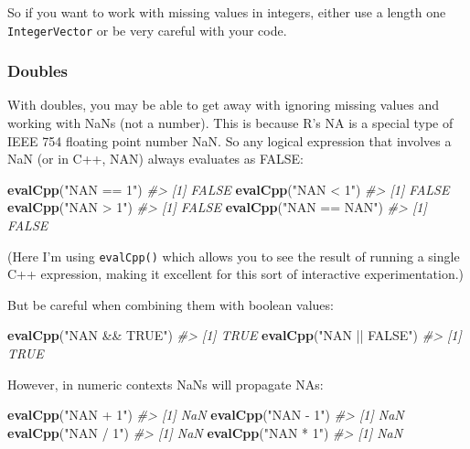 \documentclass[]{book}
\newenvironment{Shaded}{\begin{snugshade}}{\end{snugshade}}
\newcommand{\CommentTok}[1]{\textcolor[rgb]{0.37,0.37,0.37}{\textit{#1}}}
\newcommand{\KeywordTok}[1]{\textcolor[rgb]{0.27,0.27,0.27}{\textbf{#1}}}
\newcommand{\NormalTok}[1]{#1}
\newcommand{\StringTok}[1]{\textcolor[rgb]{0.5,0.5,0.5}{#1}}
\begin{document}
So if you want to work with missing values in integers, either use a length one \texttt{IntegerVector} or be very careful with your code.

\hypertarget{doubles}{%
\subsubsection{Doubles}\label{doubles}}

With doubles, you may be able to get away with ignoring missing values and working with NaNs (not a number). This is because R's NA is a special type of IEEE 754 floating point number NaN. So any logical expression that involves a NaN (or in C++, NAN) always evaluates as FALSE:

\begin{Shaded}
\begin{Highlighting}[]
\KeywordTok{evalCpp}\NormalTok{(}\StringTok{"NAN == 1"}\NormalTok{)}
\CommentTok{#> [1] FALSE}
\KeywordTok{evalCpp}\NormalTok{(}\StringTok{"NAN < 1"}\NormalTok{)}
\CommentTok{#> [1] FALSE}
\KeywordTok{evalCpp}\NormalTok{(}\StringTok{"NAN > 1"}\NormalTok{)}
\CommentTok{#> [1] FALSE}
\KeywordTok{evalCpp}\NormalTok{(}\StringTok{"NAN == NAN"}\NormalTok{)}
\CommentTok{#> [1] FALSE}
\end{Highlighting}
\end{Shaded}

(Here I'm using \texttt{evalCpp()} which allows you to see the result of running a single C++ expression, making it excellent for this sort of interactive experimentation.)

But be careful when combining them with boolean values:

\begin{Shaded}
\begin{Highlighting}[]
\KeywordTok{evalCpp}\NormalTok{(}\StringTok{"NAN && TRUE"}\NormalTok{)}
\CommentTok{#> [1] TRUE}
\KeywordTok{evalCpp}\NormalTok{(}\StringTok{"NAN || FALSE"}\NormalTok{)}
\CommentTok{#> [1] TRUE}
\end{Highlighting}
\end{Shaded}

However, in numeric contexts NaNs will propagate NAs:

\begin{Shaded}
\begin{Highlighting}[]
\KeywordTok{evalCpp}\NormalTok{(}\StringTok{"NAN + 1"}\NormalTok{)}
\CommentTok{#> [1] NaN}
\KeywordTok{evalCpp}\NormalTok{(}\StringTok{"NAN - 1"}\NormalTok{)}
\CommentTok{#> [1] NaN}
\KeywordTok{evalCpp}\NormalTok{(}\StringTok{"NAN / 1"}\NormalTok{)}
\CommentTok{#> [1] NaN}
\KeywordTok{evalCpp}\NormalTok{(}\StringTok{"NAN * 1"}\NormalTok{)}
\CommentTok{#> [1] NaN}
\end{Highlighting}
\end{Shaded}
\end{document}

